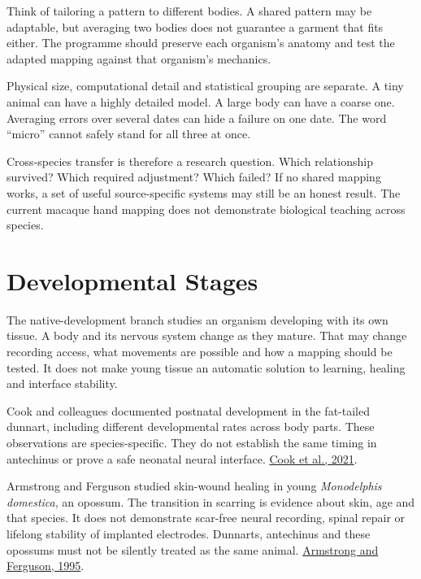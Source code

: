 Think of tailoring a pattern to different bodies. A shared pattern may be adaptable, but averaging two bodies does not guarantee a garment that fits either. The programme should preserve each organism's anatomy and test the adapted mapping against that organism's mechanics.\par

Physical size, computational detail and statistical grouping are separate. A tiny animal can have a highly detailed model. A large body can have a coarse one. Averaging errors over several dates can hide a failure on one date. The word ``micro'' cannot safely stand for all three at once.\par

Cross-species transfer is therefore a research question. Which relationship survived? Which required adjustment? Which failed? If no shared mapping works, a set of useful source-specific systems may still be an honest result. The current macaque hand mapping does not demonstrate biological teaching across species.\par

\section{Developmental Stages}

The native-development branch studies an organism developing with its own tissue. A body and its nervous system change as they mature. That may change recording access, what movements are possible and how a mapping should be tested. It does not make young tissue an automatic solution to learning, healing and interface stability.\par

Cook and colleagues documented postnatal development in the fat-tailed dunnart, including different developmental rates across body parts. These observations are species-specific. They do not establish the same timing in antechinus or prove a safe neonatal neural interface. \href{https://www.nature.com/articles/s42003-021-02506-2}{Cook et al., 2021}.\par

Armstrong and Ferguson studied skin-wound healing in young \emph{Monodelphis domestica}, an opossum. The transition in scarring is evidence about skin, age and that species. It does not demonstrate scar-free neural recording, spinal repair or lifelong stability of implanted electrodes. Dunnarts, antechinus and these opossums must not be silently treated as the same animal. \href{https://pubmed.ncbi.nlm.nih.gov/7750642/}{Armstrong and Ferguson, 1995}.\par

